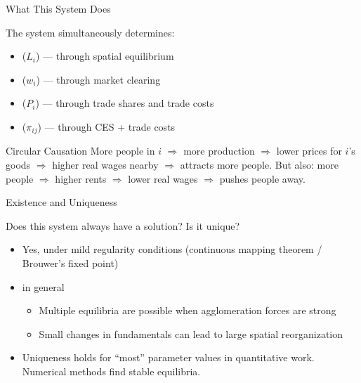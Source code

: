 \documentclass{beamer}
\begin{document}
\begin{frame}{What This System Does}

    The system simultaneously determines:

    \vspace{0.3em}
    \begin{itemize}
        \item {} ($L_i$) --- through spatial equilibrium
        \item {} ($w_i$) --- through market clearing
        \item {} ($P_i$) --- through trade shares and trade costs
        \item {} ($\pi_{ij}$) --- through CES + trade costs
    \end{itemize}

    \vspace{0.5em}
    \begin{block}{Circular Causation}
        More people in $i$ $\Rightarrow$ more production $\Rightarrow$ lower prices for $i$'s goods $\Rightarrow$ higher real wages nearby $\Rightarrow$ attracts more people. But also: more people $\Rightarrow$ higher rents $\Rightarrow$ lower real wages $\Rightarrow$ pushes people away.
    \end{block}

    \vspace{0.3em}

\end{frame}

\begin{frame}{Existence and Uniqueness}

    Does this system always have a solution? Is it unique?

    \vspace{0.5em}
    \begin{itemize}
        \item {} Yes, under mild regularity conditions (continuous mapping theorem / Brouwer's fixed point)
        \item {}  in general
            \begin{itemize}
                \item Multiple equilibria are possible when agglomeration forces are strong
                \item Small changes in fundamentals can lead to large spatial reorganization
            \end{itemize}
        \item {} Uniqueness holds for ``most'' parameter values in quantitative work. Numerical methods find stable equilibria.
    \end{itemize}

    \vspace{0.5em}

\end{frame}
\end{document}
